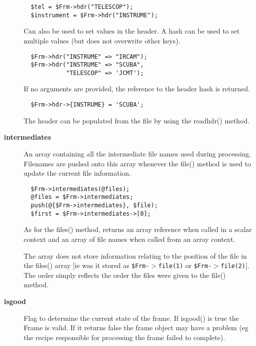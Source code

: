 \begin{description}
\begin{verbatim}
  $tel = $Frm->hdr("TELESCOP");
  $instrument = $Frm->hdr("INSTRUME");
\end{verbatim}


Can also be used to set values in the header.
A hash can be used to set multiple values (but does not overwrite
other keys).

\begin{verbatim}
  $Frm->hdr("INSTRUME" => "IRCAM");
  $Frm->hdr("INSTRUME" => "SCUBA", 
            "TELESCOP" => 'JCMT');
\end{verbatim}


If no arguments are provided, the reference to the header hash
is returned.

\begin{verbatim}
  $Frm->hdr->{INSTRUME} = 'SCUBA';
\end{verbatim}


The header can be populated from the file by using the readhdr()
method.

\item[\textbf{intermediates}] \mbox{}

An array containing all the intermediate file names used
during processing. Filenames are pushed onto this array
whenever the file() method is used to update the current
file information.

\begin{verbatim}
  $Frm->intermediates(@files);
  @files = $Frm->intermediates;
  push(@{$Frm->intermediates}, $file);
  $first = $Frm->intermediates->[0];
\end{verbatim}


As for the files() method, returns an array reference when
called in a scalar context and an array of file names when
called from an array context.



The array does not store information relating to the position of the
file in the files() array [ie was it stored as \texttt{\$Frm-$>$file(1)} or
\texttt{\$Frm-$>$file(2)}]. The order simply reflects the order the files
were given to the file() method.

\item[\textbf{isgood}] \mbox{}

Flag to determine the current state of the frame. If isgood()
is true the Frame is valid. If it returns false the frame
object may have a problem (eg the recipe responsible for 
processing the frame failed to complete).




\end{description}
